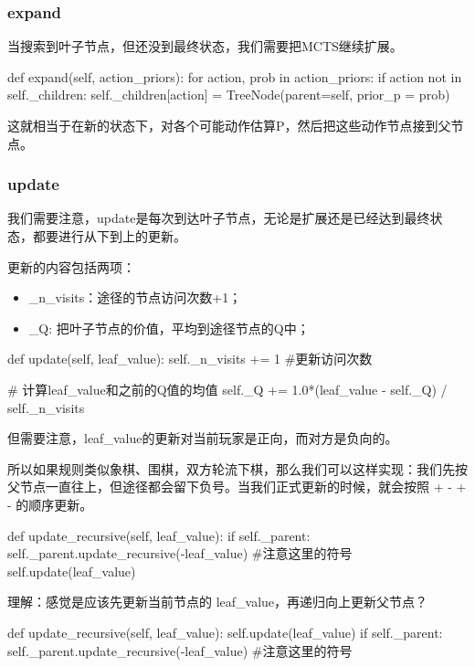 \documentclass[12pt]{article}
\begin{document}
\subsubsection{expand}
当搜索到叶子节点，但还没到最终状态，我们需要把MCTS继续扩展。
\begin{python}
def expand(self, action_priors):
    for action, prob in action_priors:
        if action not in self._children:
            self._children[action] = TreeNode(parent=self, prior_p = prob)
\end{python}
这就相当于在新的状态下，对各个可能动作估算P，然后把这些动作节点接到父节点。

\subsubsection{update}
我们需要注意，update是每次到达叶子节点，无论是扩展还是已经达到最终状态，都要进行从下到上的更新。

更新的内容包括两项：
\begin{itemize}
\setlength{\itemsep}{0pt}
\setlength{\parsep}{0pt}
\setlength{\parskip}{0pt}
    \item \_n\_visits：途径的节点访问次数+1；
    \item \_Q: 把叶子节点的价值，平均到途径节点的Q中；
\end{itemize}

\begin{python}
def update(self, leaf_value):
    self._n_visits += 1             #更新访问次数

    # 计算leaf_value和之前的Q值的均值
    self._Q += 1.0*(leaf_value - self._Q) / self._n_visits
\end{python}

但需要注意，leaf\_value的更新对当前玩家是正向，而对方是负向的。

所以如果规则类似象棋、围棋，双方轮流下棋，那么我们可以这样实现：我们先按父节点一直往上，但途径都会留下负号。当我们正式更新的时候，就会按照 + - + - 的顺序更新。
\begin{python}
def update_recursive(self, leaf_value):
    if self._parent:
        self._parent.update_recursive(-leaf_value)  #注意这里的符号
    self.update(leaf_value)
\end{python}
\begin{framed}
理解：感觉是应该先更新当前节点的 leaf\_value，再递归向上更新父节点？
\begin{python}
def update_recursive(self, leaf_value):
    self.update(leaf_value)
    if self._parent:
        self._parent.update_recursive(-leaf_value)  #注意这里的符号
\end{python}
\end{framed}
\end{document}
